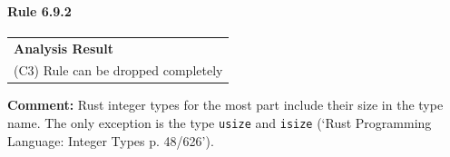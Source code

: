 \paragraph{Rule 6.9.2}
\begin{longtable}{p{13cm}}
\textbf{Analysis Result} \\
(C3) Rule can be dropped completely \\
\end{longtable}
\textbf{Comment:} Rust integer types for the most part include their size in the type name. The only exception is the type \texttt{usize} and \texttt{isize} (`Rust Programming Language: Integer Types p. 48/626'). \\
